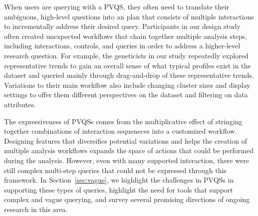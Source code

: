 \par When users are querying with a PVQS, they often need to translate their ambiguous, high-level questions into an plan that consists of multiple interactions to incrementally address their desired query. Participants in our \zv design study often created unexpected workflows that chain together multiple analysis steps, including interactions, controls, and queries in order to address a higher-level research question. For example, the geneticists in our study repeatedly explored representative trends to gain an overall sense of what typical profiles exist in the dataset and queried mainly through drag-and-drop of these representative trends. Variations to their main workflow also include changing cluster sizes and display settings to offer them different perspectives on the dataset and filtering on data attributes. 
\par The expressiveness of PVQSs comes from the multiplicative effect of stringing together combinations of interaction sequeneces into a customized workflow. Designing features that diversifies potential variations and helps the creation of multiple analysis workflows expands the space of actions that could be performed during the analysis. However, even with many supported interaction, there were still complex multi-step queries that could not be expressed through this framework. In Section~\ref{sec:vague}, we highlight the challenges in PVQSs in supporting these types of queries, highlight the need for tools that support complex and vague querying, and survey several promising directions of ongoing research in this area.

